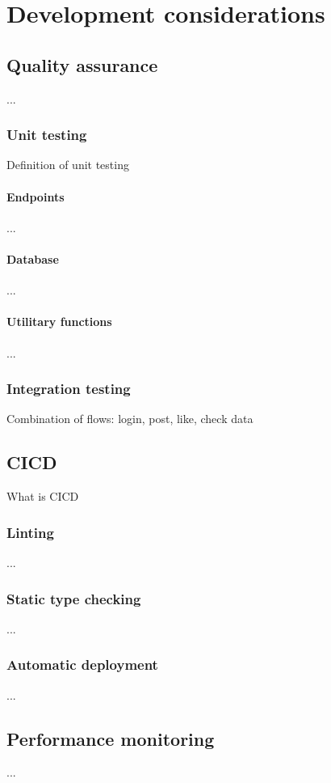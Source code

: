 \chapter{Development considerations}
    \section{Quality assurance}
    ...
    \subsection{Unit testing}
    Definition of unit testing
    \subsubsection{Endpoints}
    ...
    \subsubsection{Database}
    ...
    \subsubsection{Utilitary functions}
    ...
    \subsection{Integration testing}
    Combination of flows: login, post, like, check data
    
    \section{CICD}
    What is CICD
    \subsection{Linting}
    ...
    \subsection{Static type checking}
    ...
    \subsection{Automatic deployment}
    ...
    
    \section{Performance monitoring}
    ...
    
